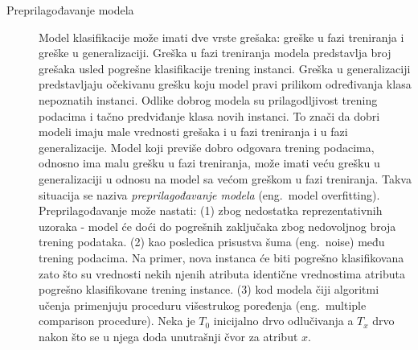 \documentclass[12pt,oneside]{memoir}
\begin{document}
\begin{description}
\item[Preprilagođavanje modela] Model klasifikacije može imati dve vrste grešaka: greške u fazi treniranja i greške u generalizaciji. Greška u fazi treniranja modela predstavlja broj grešaka usled pogrešne klasifikacije trening instanci. Greška u generalizaciji predstavljaju očekivanu grešku koju model pravi prilikom određivanja klasa nepoznatih instanci. Odlike dobrog modela su prilagodljivost trening podacima i tačno predviđanje klasa novih instanci. To znači da dobri modeli imaju male vrednosti grešaka i u fazi treniranja i u fazi generalizacije. Model koji previše dobro odgovara trening podacima, odnosno ima malu grešku u fazi treniranja, može imati veću grešku u generalizaciji u odnosu na model sa većom greškom u fazi treniranja. Takva situacija se naziva \textit{preprilagođavanje modela} (eng.~model overfitting). Preprilagođavanje može nastati: (1) zbog nedostatka reprezentativnih uzoraka - model će doći do pogrešnih zaključaka zbog nedovoljnog broja trening podataka. (2) kao posledica prisustva šuma (eng.~noise) među trening podacima. Na primer, nova instanca će biti pogrešno klasifikovana zato što su vrednosti nekih njenih atributa identične vrednostima atributa pogrešno klasifikovane trening instance.  (3) kod modela čiji algoritmi učenja primenjuju proceduru višestrukog poređenja (eng.~multiple comparison procedure). Neka je $T_0$ inicijalno drvo odlučivanja a $T_x$ drvo nakon što se u njega doda unutrašnji čvor za atribut $x$. %

\end{description}
\end{document}
